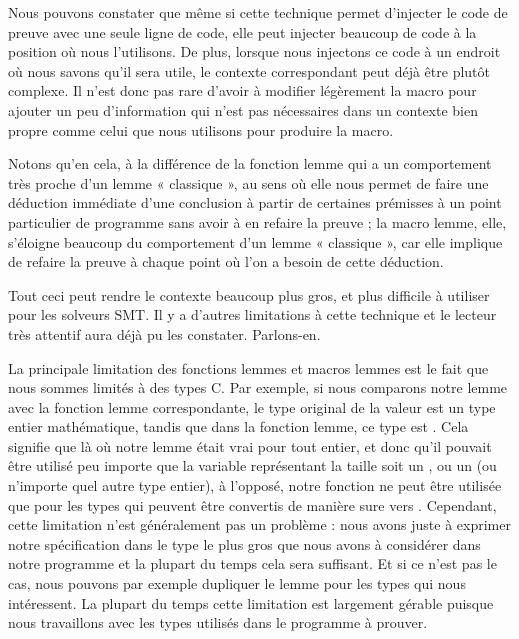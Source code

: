 Nous pouvons constater que même si cette technique permet d'injecter le code de
preuve avec une seule ligne de code, elle peut injecter beaucoup de code à la
position où nous l'utilisons. De plus, lorsque nous injectons ce code à un endroit
où nous savons qu'il sera utile, le contexte correspondant peut déjà être plutôt
complexe. Il n'est donc pas rare d'avoir à modifier légèrement la macro pour
ajouter un peu d'information qui n'est pas nécessaires dans un contexte bien
propre comme celui que nous utilisons pour produire la macro.


Notons qu'en cela, à la différence de la fonction lemme qui a un comportement
très proche d'un lemme « classique », au sens où elle nous permet de faire une
déduction immédiate d'une conclusion à partir de certaines prémisses à un point
particulier de programme sans avoir à en refaire la preuve ; la macro lemme,
elle, s'éloigne beaucoup du comportement d'un lemme « classique », car elle
implique de refaire la preuve à chaque point où l'on a besoin de cette déduction.


Tout ceci peut rendre le contexte beaucoup plus gros, et plus difficile à utiliser
pour les solveurs SMT. Il y a d'autres limitations à cette technique et le lecteur
très attentif aura déjà pu les constater. Parlons-en.





La principale limitation des fonctions lemmes et macros lemmes
est le fait que nous sommes limités à des types C. Par exemple, si nous
comparons notre lemme  avec la
fonction lemme correspondante, le type original de la valeur
 est un type entier mathématique, tandis que dans la
fonction lemme, ce type est . Cela signifie que là
où notre lemme était vrai pour tout entier, et donc qu'il pouvait être utilisé
peu importe que la variable représentant la taille soit un ,
ou un  (ou n'importe quel autre type entier), à l'opposé,
notre fonction ne peut être utilisée que pour les types qui peuvent être
convertis de manière sure vers . Cependant, cette limitation
n'est généralement pas un problème : nous avons juste à exprimer notre
spécification dans le type le plus gros que nous avons à considérer dans notre
programme et la plupart du temps cela sera suffisant. Et si ce n'est pas le cas,
nous pouvons par exemple dupliquer le lemme pour les types qui nous intéressent.
La plupart du temps cette limitation est largement gérable puisque nous
travaillons avec les types utilisés dans le programme à prouver.


